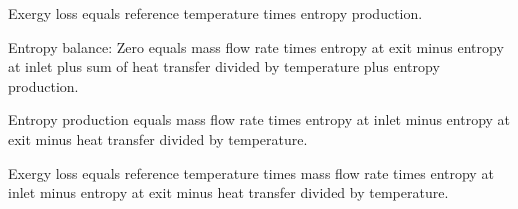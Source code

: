Exergy loss equals reference temperature times entropy production.  

Entropy balance:  
Zero equals mass flow rate times entropy at exit minus entropy at inlet plus sum of heat transfer divided by temperature plus entropy production.  

Entropy production equals mass flow rate times entropy at inlet minus entropy at exit minus heat transfer divided by temperature.  

Exergy loss equals reference temperature times mass flow rate times entropy at inlet minus entropy at exit minus heat transfer divided by temperature.